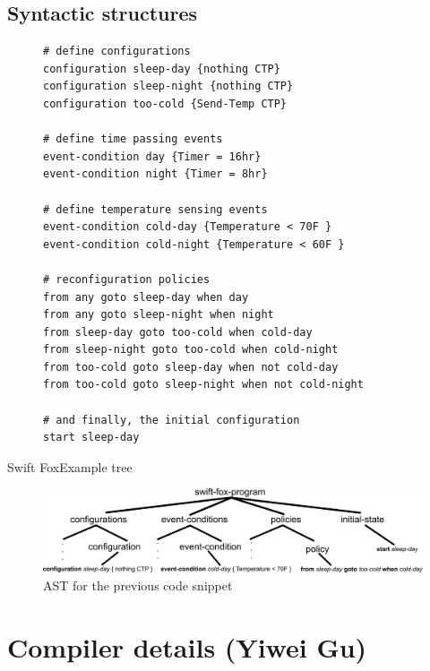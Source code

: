 \documentclass{beamer}
\begin{document}
\subsection[Syntax]{Syntactic structures}

\begin{frame}[fragile]
\tiny
	\begin{figure}
	\begin{center}
\begin{verbatim}
# define configurations
configuration sleep-day {nothing CTP}
configuration sleep-night {nothing CTP}
configuration too-cold {Send-Temp CTP}

# define time passing events
event-condition day {Timer = 16hr}
event-condition night {Timer = 8hr}

# define temperature sensing events
event-condition cold-day {Temperature < 70F }
event-condition cold-night {Temperature < 60F }

# reconfiguration policies
from any goto sleep-day when day
from any goto sleep-night when night
from sleep-day goto too-cold when cold-day
from sleep-night goto too-cold when cold-night
from too-cold goto sleep-day when not cold-day
from too-cold goto sleep-night when not cold-night

# and finally, the initial configuration
start sleep-day
\end{verbatim}
	\end{center}
	\end{figure}
\end{frame}

\begin{frame}{Swift Fox}{Example tree}
	\begin{figure}
		\begin{center}
		\includegraphics[scale=0.08]{fig/tree.pdf}
		\end{center}
		\caption{AST for the previous code snippet}
	\end{figure} 
\end{frame}


\section[Compiler details]{Compiler details (Yiwei Gu)}
\end{document}

